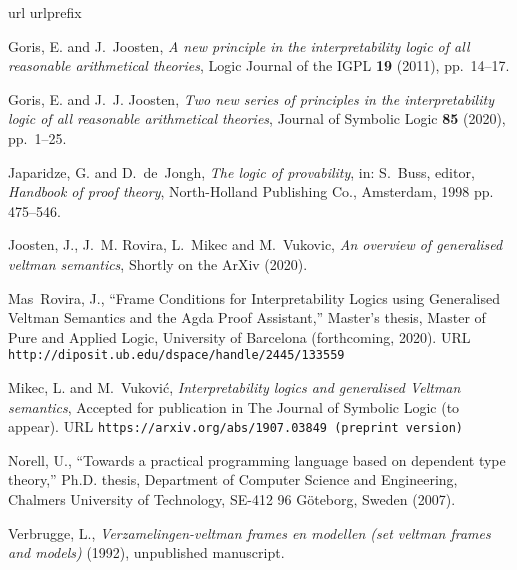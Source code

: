 \documentclass[twoside]{aiml20}
\begin{document}
\begin{thebibliography}{1}
\expandafter\ifx\csname url\endcsname\relax
  \def\url#1{\texttt{#1}}\fi
\expandafter\ifx\csname urlprefix\endcsname\relax\def\urlprefix{URL }\fi
\newcommand{\enquote}[1]{``#1''}

Goris, E. and J.~Joosten, \emph{A new principle in the interpretability logic
  of all reasonable arithmetical theories}, Logic Journal of the IGPL
  \textbf{19} (2011), pp.~14--17.

Goris, E. and J.~J. Joosten, \emph{Two new series of principles in the
  interpretability logic of all reasonable arithmetical theories}, Journal of
  Symbolic Logic \textbf{85} (2020), pp.~1--25.

Japaridze, G. and D.~{de}~Jongh, \emph{The logic of provability}, in: S.~Buss,
  editor, \emph{Handbook of proof theory}, North-Holland Publishing Co.,
  Amsterdam, 1998 pp. 475--546.

Joosten, J., J.~M. Rovira, L.~Mikec and M.~Vukovic, \emph{An overview of
  generalised veltman semantics}, Shortly on the ArXiv  (2020).

Mas~Rovira, J., \enquote{Frame {C}onditions for {I}nterpretability {L}ogics
  using {G}eneralised {V}eltman {S}emantics and the {A}gda {P}roof
  {A}ssistant,} Master's thesis, Master of Pure and Applied Logic, University
  of Barcelona (forthcoming, 2020).
\newline\urlprefix\url{http://diposit.ub.edu/dspace/handle/2445/133559}

Mikec, L. and M.~Vuković, \emph{Interpretability logics and generalised
  {V}eltman semantics}, Accepted for publication in The Journal of Symbolic
  Logic  (to appear).
\newline\urlprefix\url{https://arxiv.org/abs/1907.03849 (preprint version)}

Norell, U., \enquote{Towards a practical programming language based on
  dependent type theory,} Ph.D. thesis, Department of Computer Science and
  Engineering, Chalmers University of Technology, SE-412 96 G\"{o}teborg,
  Sweden (2007).

Verbrugge, L., \emph{Verzamelingen-veltman frames en modellen (set veltman
  frames and models)} (1992), unpublished manuscript.

\end{thebibliography}
\end{document}
